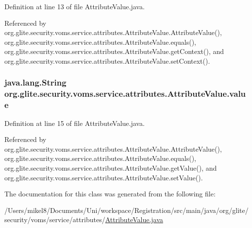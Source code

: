 Definition at line 13 of file AttributeValue.java.



Referenced by org.glite.security.voms.service.attributes.AttributeValue.AttributeValue(), org.glite.security.voms.service.attributes.AttributeValue.equals(), org.glite.security.voms.service.attributes.AttributeValue.getContext(), and org.glite.security.voms.service.attributes.AttributeValue.setContext().

\hypertarget{classorg_1_1glite_1_1security_1_1voms_1_1service_1_1attributes_1_1AttributeValue_aa1f50539b35f3efd45c50ca8165f52d8}{
\subsubsection[{value}]{\setlength{\rightskip}{0pt plus 5cm}java.lang.String {\bf org.glite.security.voms.service.attributes.AttributeValue.value}}}
\label{classorg_1_1glite_1_1security_1_1voms_1_1service_1_1attributes_1_1AttributeValue_aa1f50539b35f3efd45c50ca8165f52d8}


Definition at line 15 of file AttributeValue.java.



Referenced by org.glite.security.voms.service.attributes.AttributeValue.AttributeValue(), org.glite.security.voms.service.attributes.AttributeValue.equals(), org.glite.security.voms.service.attributes.AttributeValue.getValue(), and org.glite.security.voms.service.attributes.AttributeValue.setValue().



The documentation for this class was generated from the following file:\begin{DoxyCompactItemize}
\item 
/Users/mikel8/Documents/Uni/workspace/Registration/src/main/java/org/glite/security/voms/service/attributes/\hyperlink{AttributeValue_8java}{AttributeValue.java}\end{DoxyCompactItemize}
